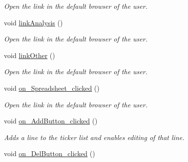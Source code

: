 \begin{DoxyCompactItemize}
\begin{DoxyCompactList}\small\item\em Open the link in the default browser of the user. \end{DoxyCompactList}\item 
\hypertarget{class_t_k_r_t_a_p_a74b55a81eb15e9eee97e901598be20eb}{void \hyperlink{class_t_k_r_t_a_p_a74b55a81eb15e9eee97e901598be20eb}{link\+Analysis} ()}\label{class_t_k_r_t_a_p_a74b55a81eb15e9eee97e901598be20eb}

\begin{DoxyCompactList}\small\item\em Open the link in the default browser of the user. \end{DoxyCompactList}\item 
\hypertarget{class_t_k_r_t_a_p_a118fbdc56d14b61c21ee360fb178b393}{void \hyperlink{class_t_k_r_t_a_p_a118fbdc56d14b61c21ee360fb178b393}{link\+Other} ()}\label{class_t_k_r_t_a_p_a118fbdc56d14b61c21ee360fb178b393}

\begin{DoxyCompactList}\small\item\em Open the link in the default browser of the user. \end{DoxyCompactList}\item 
\hypertarget{class_t_k_r_t_a_p_a5019b726b6b221933abc42259996a999}{void \hyperlink{class_t_k_r_t_a_p_a5019b726b6b221933abc42259996a999}{on\+\_\+\+Spreadsheet\+\_\+clicked} ()}\label{class_t_k_r_t_a_p_a5019b726b6b221933abc42259996a999}

\begin{DoxyCompactList}\small\item\em Open the link in the default browser of the user. \end{DoxyCompactList}\item 
\hypertarget{class_t_k_r_t_a_p_a55ad82b64ab31eba3e8ac1aa56e3645e}{void \hyperlink{class_t_k_r_t_a_p_a55ad82b64ab31eba3e8ac1aa56e3645e}{on\+\_\+\+Add\+Button\+\_\+clicked} ()}\label{class_t_k_r_t_a_p_a55ad82b64ab31eba3e8ac1aa56e3645e}

\begin{DoxyCompactList}\small\item\em Adds a line to the ticker list and enables editing of that line. \end{DoxyCompactList}\item 
\hypertarget{class_t_k_r_t_a_p_a56fe0e3c4f6ba41aa41ee94464a7c6c0}{void \hyperlink{class_t_k_r_t_a_p_a56fe0e3c4f6ba41aa41ee94464a7c6c0}{on\+\_\+\+Del\+Button\+\_\+clicked} ()}\label{class_t_k_r_t_a_p_a56fe0e3c4f6ba41aa41ee94464a7c6c0}


\end{DoxyCompactItemize}
